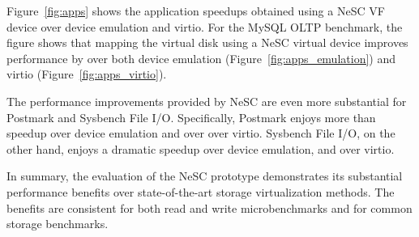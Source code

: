 Figure~\ref{fig:apps} shows the application speedups obtained using a NeSC VF device over device emulation and virtio. For the MySQL OLTP benchmark, the figure shows that mapping the virtual disk using a NeSC virtual device improves performance by  over both device emulation (Figure~\ref{fig:apps_emulation}) and virtio (Figure~\ref{fig:apps_virtio}).

The performance improvements provided by NeSC are even more substantial for Postmark and Sysbench File I/O.
Specifically, Postmark enjoys more than  speedup over device emulation and over  over virtio. Sysbench File I/O, on the other hand, enjoys a dramatic  speedup over device emulation, and  over virtio.

In summary, the evaluation of the NeSC prototype demonstrates its substantial performance benefits over state-of-the-art storage virtualization methods. The benefits are consistent for both read and write microbenchmarks and for common storage benchmarks.

